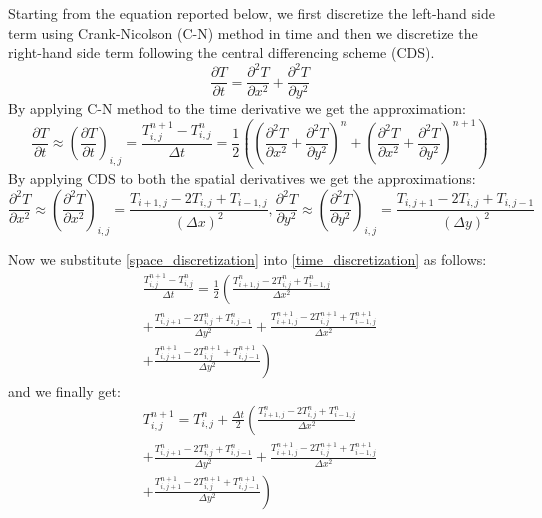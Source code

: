 \documentclass{article}
\begin{document}
Starting from the equation reported below, we first discretize the left-hand side term using Crank-Nicolson (C-N) method in time and then we discretize the right-hand side term following the central differencing scheme (CDS).
\begin{equation} 
  \frac{\partial T}{\partial t} = \frac{\partial^2 T}{\partial x^2} + \frac{\partial^2 T}{\partial y^2} \label{eq_reference}
\end{equation}
By applying C-N method to the time derivative we get the approximation:
\begin{equation} 
  \frac{\partial T}{\partial t} \approx \left(\frac{\partial T}{\partial t}\right)_{i,j} = \frac{T_{i,j}^{n+1} - T_{i,j}^n}{\Delta t} = \frac{1}{2}\left(\left(\frac{\partial^2 T}{\partial x^2} + \frac{\partial^2 T}{\partial y^2}\right)^{n} + \left(\frac{\partial^2 T}{\partial x^2} + \frac{\partial^2 T}{\partial y^2}\right)^{n+1}\right) \label{time_discretization}
\end{equation}
By applying CDS to both the spatial derivatives we get the approximations:
\begin{equation} 
  \frac{\partial^2 T}{\partial x^2} \approx \left(\frac{\partial^2 T}{\partial x^2}\right)_{i,j} = \frac{T_{i+1,j} - 2T_{i,j} + T_{i-1,j}}{(\Delta x)^2}, \label{space_discretization}
  \frac{\partial^2 T}{\partial y^2} \approx \left(\frac{\partial^2 T}{\partial y^2}\right)_{i,j} = \frac{T_{i,j+1} - 2T_{i,j} + T_{i,j-1}}{(\Delta y)^2}
\end{equation}

Now we substitute \eqref{space_discretization} into \eqref{time_discretization} as follows:
\begin{multline}
  \frac{T_{i,j}^{n+1} - T_{i,j}^n}{\Delta t} = \frac{1}{2}\left(\frac{T_{i+1,j}^n - 2T_{i,j}^n + T_{i-1,j}^n}{\Delta x^2} \right.\\
  + \frac{T_{i,j+1}^n - 2T_{i,j}^n + T_{i,j-1}^n}{\Delta y^2} +\frac{T_{i+1,j}^{n+1} - 2T_{i,j}^{n+1}+ T_{i-1,j}^{n+1}}{\Delta x^2} \\
  \left. + \frac{T_{i,j+1}^{n+1} - 2T_{i,j}^{n+1} + T_{i,j-1}^{n+1}}{\Delta y^2}\right)
\end{multline}
and we finally get:
\begin{multline} \label{final_discretization}
  T_{i,j}^{n+1} = T_{i,j}^n + \frac{\Delta t}{2}\left(\frac{T_{i+1,j}^n - 2T_{i,j}^n + T_{i-1,j}^n}{\Delta x^2} \right. \\
  + \frac{T_{i,j+1}^n - 2T_{i,j}^n + T_{i,j-1}^n}{\Delta y^2} + \frac{T_{i+1,j}^{n+1} - 2T_{i,j}^{n+1} + T_{i-1,j}^{n+1}}{\Delta x^2}\\
  \left.+ \frac{T_{i,j+1}^{n+1} - 2T_{i,j}^{n+1} + T_{i,j-1}^{n+1}}{\Delta y^2}\right)
\end{multline}
\end{document}
